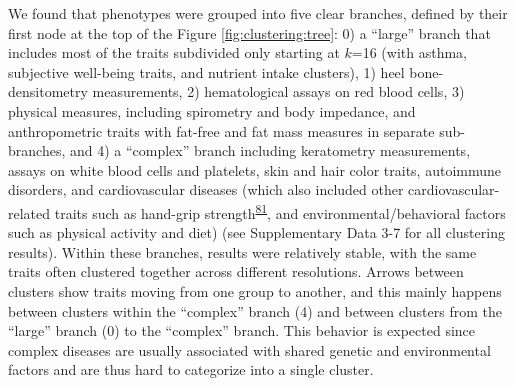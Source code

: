 \documentclass[
  a4paper,
]{article}
\begin{document}
We found that phenotypes were grouped into five clear branches, defined by their first node at the top of the Figure \ref{fig:clustering:tree}:
0) a ``large'' branch that includes most of the traits subdivided only starting at \(k\)=16 (with asthma, subjective well-being traits, and nutrient intake clusters),
1) heel bone-densitometry measurements,
2) hematological assays on red blood cells,
3) physical measures, including spirometry and body impedance, and anthropometric traits with fat-free and fat mass measures in separate sub-branches, and
4) a ``complex'' branch including keratometry measurements, assays on white blood cells and platelets, skin and hair color traits, autoimmune disorders, and cardiovascular diseases (which also included other cardiovascular-related traits such as hand-grip strength\textsuperscript{\protect\hyperlink{ref-aBVh8zt1}{81}}, and environmental/behavioral factors such as physical activity and diet) (see Supplementary Data 3-7 for all clustering results).
Within these branches, results were relatively stable, with the same traits often clustered together across different resolutions.
Arrows between clusters show traits moving from one group to another, and this mainly happens between clusters within the ``complex'' branch (4) and between clusters from the ``large'' branch (0) to the ``complex'' branch.
This behavior is expected since complex diseases are usually associated with shared genetic and environmental factors and are thus hard to categorize into a single cluster.
\end{document}
